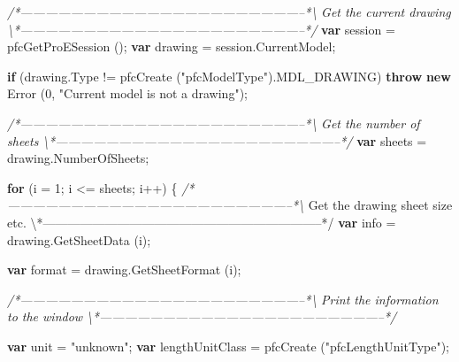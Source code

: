 \documentclass[]{article}
\newenvironment{Shaded}{}{}
\newcommand{\KeywordTok}[1]{\textcolor[rgb]{0.00,0.44,0.13}{\textbf{{#1}}}}
\newcommand{\DecValTok}[1]{\textcolor[rgb]{0.25,0.63,0.44}{{#1}}}
\newcommand{\StringTok}[1]{\textcolor[rgb]{0.25,0.44,0.63}{{#1}}}
\newcommand{\CommentTok}[1]{\textcolor[rgb]{0.38,0.63,0.69}{\textit{{#1}}}}
\newcommand{\OtherTok}[1]{\textcolor[rgb]{0.00,0.44,0.13}{{#1}}}
\newcommand{\FunctionTok}[1]{\textcolor[rgb]{0.02,0.16,0.49}{{#1}}}
\newcommand{\NormalTok}[1]{{#1}}
\begin{document}
\begin{Shaded}
\begin{Highlighting}[]
\CommentTok{/*--------------------------------------------------------------------*\textbackslash{} }
\CommentTok{  Get the current drawing}
\CommentTok{\textbackslash{}*--------------------------------------------------------------------*/}
  \KeywordTok{var} \NormalTok{session = }\FunctionTok{pfcGetProESession} \NormalTok{();}
  \KeywordTok{var} \NormalTok{drawing = }\OtherTok{session}\NormalTok{.}\FunctionTok{CurrentModel}\NormalTok{;}
  
  \KeywordTok{if} \NormalTok{(}\OtherTok{drawing}\NormalTok{.}\FunctionTok{Type} \NormalTok{!= }\FunctionTok{pfcCreate} \NormalTok{(}\StringTok{"pfcModelType"}\NormalTok{).}\FunctionTok{MDL_DRAWING}\NormalTok{)}
    \KeywordTok{throw} \KeywordTok{new} \FunctionTok{Error} \NormalTok{(}\DecValTok{0}\NormalTok{, }\StringTok{"Current model is not a drawing"}\NormalTok{);}
  
\CommentTok{/*--------------------------------------------------------------------*\textbackslash{} }
\CommentTok{  Get the number of sheets}
\CommentTok{\textbackslash{}*--------------------------------------------------------------------*/}
  \KeywordTok{var} \NormalTok{sheets = }\OtherTok{drawing}\NormalTok{.}\FunctionTok{NumberOfSheets}\NormalTok{;}
  
  \KeywordTok{for} \NormalTok{(i = }\DecValTok{1}\NormalTok{; i <= sheets; i++)}
    \NormalTok{\{}
\CommentTok{/*--------------------------------------------------------------------*\textbackslash{}}
  \NormalTok{Get the drawing sheet size }\OtherTok{etc}\NormalTok{.}
\NormalTok{\textbackslash{}*--------------------------------------------------------------------*}\OtherTok{/}
      \KeywordTok{var} \NormalTok{info = }\OtherTok{drawing}\NormalTok{.}\FunctionTok{GetSheetData} \NormalTok{(i);}
      
      \KeywordTok{var} \NormalTok{format = }\OtherTok{drawing}\NormalTok{.}\FunctionTok{GetSheetFormat} \NormalTok{(i);}
      
\CommentTok{/*--------------------------------------------------------------------*\textbackslash{} }
\CommentTok{  Print the information to the window}
\CommentTok{\textbackslash{}*--------------------------------------------------------------------*/} 

      \KeywordTok{var} \NormalTok{unit = }\StringTok{"unknown"}\NormalTok{;}
      \KeywordTok{var} \NormalTok{lengthUnitClass = }\FunctionTok{pfcCreate} \NormalTok{(}\StringTok{"pfcLengthUnitType"}\NormalTok{);}
      

\end{Highlighting}
\end{Shaded}
\end{document}
